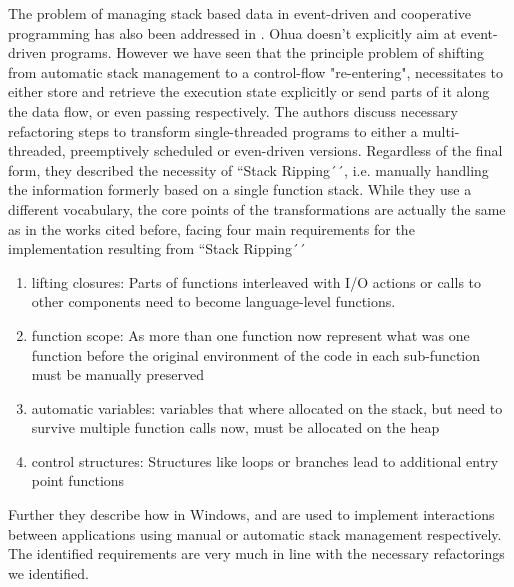 The problem of managing stack based data in event-driven and cooperative programming has  also been addressed in \cite{adya2002cooperative}. Ohua doesn't explicitly aim at event-driven programs. However we have seen that the principle problem of shifting from automatic stack management to a control-flow "re-entering", necessitates to either store and retrieve the execution state explicitly or send parts of it along the data flow, or even passing respectively. The authors discuss necessary refactoring steps to transform single-threaded programs to either a multi-threaded, preemptively scheduled  or even-driven versions. Regardless of the final form, they described the necessity of ``Stack Ripping´´, i.e. manually handling the information formerly based on a single function stack. While they use a different vocabulary, the core points of the transformations are actually the same as in the works cited before, facing four main requirements for the  implementation resulting from ``Stack Ripping´´
\begin{enumerate}
    \item lifting closures: Parts of functions interleaved with I/O actions or calls to other components need to become language-level functions.
    \item function scope: As more than one function now represent what was one function before the original environment of the code in each sub-function must be manually preserved
    \item automatic variables: variables that where allocated on the stack, but need to survive multiple function calls now, must be allocated on the heap
    \item control structures: Structures like loops or branches lead to additional entry point functions
\end{enumerate}

 Further they describe how in Windows,  and  are used to implement interactions between applications using manual or automatic stack management respectively. The identified requirements are very much in line with the necessary refactorings we identified. 
 


